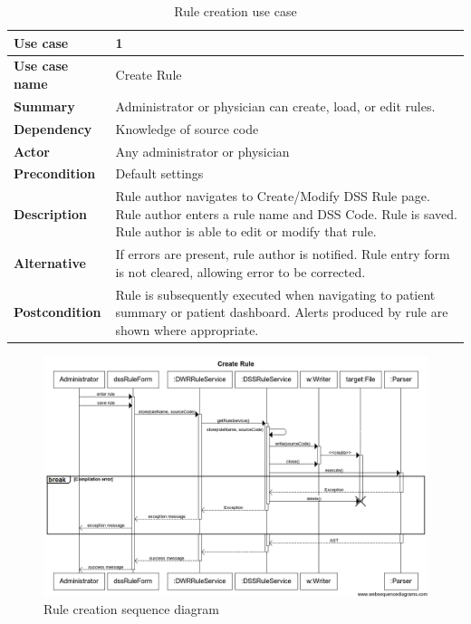 \documentclass[12pt,letterpaper]{article}
\begin{document}
\begin{table}
\begin{centering}
\begin{tabular}{ |  >{\bfseries}l | p{5in} |} \hline
Use case         &
1                \\ \hline
Use case name    &
Create Rule      \\ \hline
Summary          &
Administrator or physician can create, load, or edit rules. \\ \hline
Dependency       &
Knowledge of source code \\ \hline
Actor            &
Any administrator or physician \\ \hline
Precondition     &
Default settings \\ \hline
Description      &
Rule author navigates to Create/Modify DSS Rule page. \newline
Rule author enters a rule name and DSS Code. \newline
Rule is saved.    \newline
Rule author is able to edit or modify that rule. \\ \hline
Alternative      & 
If errors are present, rule author is notified. Rule entry form is 
not cleared, allowing error to be corrected.
\\ \hline
Postcondition    &
Rule is subsequently executed when navigating to patient 
summary or patient dashboard. \newline
Alerts produced by rule are shown where appropriate. \\ \hline
\end{tabular}
\end{centering}
\caption{Rule creation use case} \label{tab:CREATE_RULE_USE_CASE}
\end{table}

\begin{figure}\begin{center}
\includegraphics[width=6.5in]{sequence/create_rule.png}
\end{center}
\caption{Rule creation sequence diagram} 
\label{fig:CREATE_RULE_SEQUENCE}
\end{figure}
\end{document}
